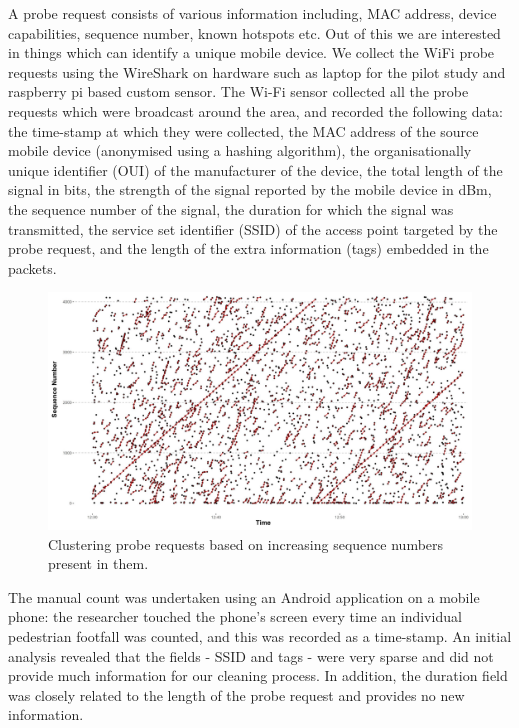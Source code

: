 \documentclass[11t, a4paper, twocolumn]{article}
\begin{document}
		
		A probe request consists of various information including, MAC address, device capabilities, sequence number, known hotspots etc. Out of this we are interested in things which can identify a unique mobile device. We collect the WiFi probe requests using the WireShark on hardware such as laptop for the pilot study and raspberry pi based custom sensor. The Wi-Fi sensor collected all the probe requests which were broadcast around the area, and recorded the following data: the time-stamp at which they were collected, the MAC address of the source mobile device (anonymised using a hashing algorithm), the organisationally unique identifier (OUI) of the manufacturer of the device, the total length of the signal in bits, the strength of the signal reported by the mobile device in dBm, the sequence number of the signal, the duration for which the signal was transmitted, the service set identifier (SSID) of the access point targeted by the probe request, and the length of the extra information (tags) embedded in the packets.
		\begin{figure}
			\begin{center}
				\includegraphics [width=\linewidth,trim=4 4 4 4,clip] {outputs/clustering_2.png}
				\caption{Clustering probe requests based on increasing sequence numbers present in them.}
				\label{clustering_pilot}
			\end{center}
		\end{figure}
		The manual count was undertaken using an Android application on a mobile phone: the researcher touched the phone’s screen every time an individual pedestrian footfall was counted, and this was recorded as a time-stamp.
		An initial analysis revealed that the fields - SSID and tags - were very sparse and did not provide much information for our cleaning process.
		In addition, the duration field was closely related to the length of the probe request and provides no new information.
\end{document}

